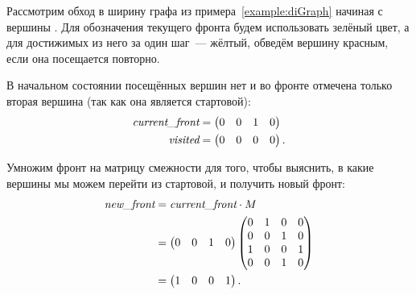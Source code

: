 \begin{example}

    Рассмотрим обход в ширину графа из примера~\ref{example:diGraph} начиная с вершины .
    Для обозначения текущего фронта будем использовать зелёный цвет, а для достижимых из него за один шаг~--- жёлтый, обведём вершину красным, если она посещается повторно.

    В начальном состоянии посещённых вершин нет и во фронте отмечена только вторая вершина (так как она является стартовой):
    \begin{align*}
        \emph{current\_front} & =
            \begin{pmatrix}
                0 & 0 & 1 & 0
            \end{pmatrix}
        \\
        \emph{visited}        & =
            \begin{pmatrix}
                0 & 0 & 0 & 0
            \end{pmatrix}.
    \end{align*}

    Умножим фронт на матрицу смежности для того, чтобы выяснить, в какие вершины мы можем перейти из стартовой, и получить новый фронт:
    \begin{align*}
        \emph{new\_front}     & = \emph{current\_front} \cdot M  \\
                              & =
                                    \begin{pmatrix}
                                        0 & 0 & 1 & 0
                                    \end{pmatrix}
                                    \begin{pmatrix}
                                        0 & 1 & 0 & 0 \\
                                        0 & 0 & 1 & 0 \\
                                        1 & 0 & 0 & 1 \\
                                        0 & 0 & 1 & 0
                                    \end{pmatrix}                 \\
                              & =
                                    \begin{pmatrix}
                                        1 & 0 & 0 & 1
                                    \end{pmatrix}.
    \end{align*}


\end{example}
